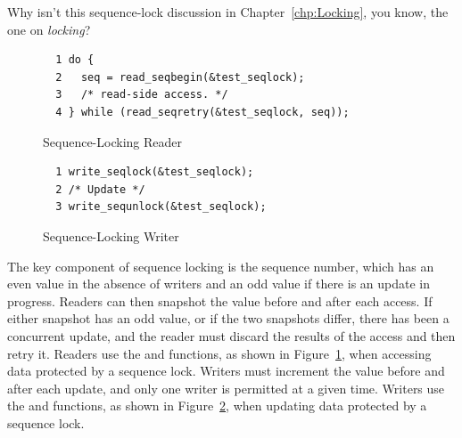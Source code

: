 \QuickQuiz{}
	Why isn't this sequence-lock discussion in Chapter~\ref{chp:Locking},
	you know, the one on \emph{locking}?
 \QuickQuizEnd

\begin{figure}[bp]
{ \scriptsize
\begin{verbatim}
  1 do {
  2   seq = read_seqbegin(&test_seqlock);
  3   /* read-side access. */
  4 } while (read_seqretry(&test_seqlock, seq));
\end{verbatim}
}
\caption{Sequence-Locking Reader}
\label{fig:defer:Sequence-Locking Reader}
\end{figure}

\begin{figure}[bp]
{ \scriptsize
\begin{verbatim}
  1 write_seqlock(&test_seqlock);
  2 /* Update */
  3 write_sequnlock(&test_seqlock);
\end{verbatim}
}
\caption{Sequence-Locking Writer}
\label{fig:defer:Sequence-Locking Writer}
\end{figure}

The key component of sequence locking is the sequence number, which has
an even value in the absence of writers and an odd value if there
is an update in progress.
Readers can then snapshot the value before and after each access.
If either snapshot has an odd value, or if the two snapshots differ,
there has been a concurrent update, and the reader must discard
the results of the access and then retry it.
Readers use the  and 
functions, as shown in Figure~\ref{fig:defer:Sequence-Locking Reader},
when accessing data protected by a sequence lock.
Writers must increment the value before and after each update,
and only one writer is permitted at a given time.
Writers use the  and 
functions, as shown in Figure~\ref{fig:defer:Sequence-Locking Writer},
when updating data protected by a sequence lock.

